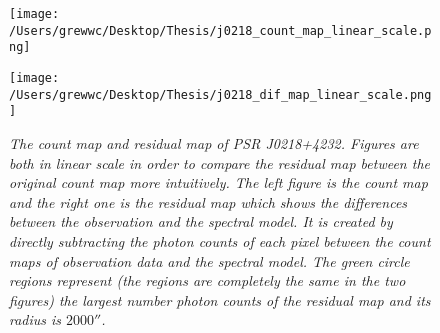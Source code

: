 \documentclass[12pt]{report}
\newcommand{\mycaption}[1]{\caption{\textit{\footnotesize #1}}}
\newcommand{\change}[1]{
  $<$\colorbox{red}{\textbf{change}}$>$#1$<$\colorbox{red}{\textbf{/change}}$>$
}
\begin{document}

            \begin{figure}[!ht]
              \begin{center}
              \begin{minipage}{0.45\textwidth}
                \begin{center} 
                  \texttt{[image: /Users/grewwc/Desktop/Thesis/j0218\_count\_map\_linear\_scale.png]}
                \end{center}
              \end{minipage}
              \begin{minipage}{0.45\textwidth}
                \begin{center}
                  \texttt{[image: /Users/grewwc/Desktop/Thesis/j0218\_dif\_map\_linear\_scale.png]}
                \end{center}
              \end{minipage}
            \end{center}
            \mycaption{The count map and residual map of PSR J0218+4232.
              Figures are both in linear scale in order to compare the residual map between the 
              original count map more intuitively. The left figure is the count map and the right 
              one is the residual map which shows the differences between the observation and the spectral 
              model. It is created by directly subtracting the photon counts of each pixel between 
              the count maps of observation data and the spectral model. The green circle regions represent
              (the regions are completely the same in the two figures)
              the largest number photon counts of the residual map and its radius is $2000''$.}
            \label{fig: j0218_count_map_diff}
            \end{figure}
\end{document}
